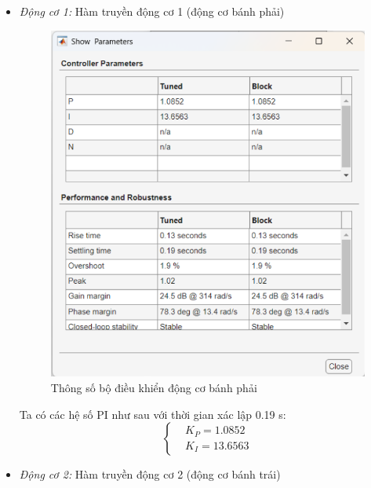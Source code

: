           \begin{itemize}
               \item \textit{Động cơ 1:} Hàm truyền động cơ 1 (động cơ bánh phải)\\
               \begin{figure}[H]
                    \centering
                    \includegraphics[width=1\textwidth]{pictures/chapter6/params_JGB1.png}
                    \caption{Thông số bộ điều khiển động cơ bánh phải}
                    \label{params_JGB1}
               \end{figure}
               \hspace*{0.6cm}Ta có các hệ số PI như sau với thời gian xác lập 0.19 s:
               \begin{equation*}
                    \begin{cases}
                         &K_P = 1.0852 \\ 
                         &K_I = 13.6563
                    \end{cases}
               \end{equation*} 
               \item \textit{Động cơ 2:} Hàm truyền động cơ 2 (động cơ bánh trái)\\

\end{itemize}

